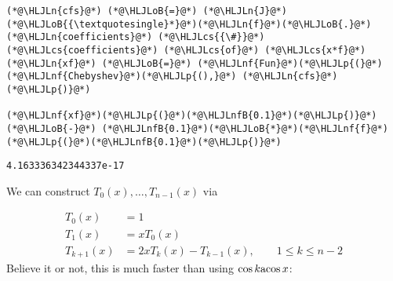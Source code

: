 \documentclass[12pt,a4paper]{article}
\newcommand{\HLJLn}[1]{#1}
\newcommand{\HLJLnf}[1]{\textcolor[RGB]{66,102,213}{#1}}
\newcommand{\HLJLnfB}[1]{\textcolor[RGB]{59,151,46}{#1}}
\newcommand{\HLJLoB}[1]{\textcolor[RGB]{102,102,102}{\textbf{#1}}}
\newcommand{\HLJLp}[1]{#1}
\newcommand{\HLJLcs}[1]{\textcolor[RGB]{153,153,119}{\textit{#1}}}
\def\acos{ {\rm acos}\, }
\begin{document}
\begin{lstlisting}
(*@\HLJLn{cfs}@*) (*@\HLJLoB{=}@*) (*@\HLJLn{J}@*)(*@\HLJLoB{{\textquotesingle}*}@*)(*@\HLJLn{f}@*)(*@\HLJLoB{.}@*)(*@\HLJLn{coefficients}@*) (*@\HLJLcs{{\#}}@*) (*@\HLJLcs{coefficients}@*) (*@\HLJLcs{of}@*) (*@\HLJLcs{x*f}@*)
(*@\HLJLn{xf}@*) (*@\HLJLoB{=}@*) (*@\HLJLnf{Fun}@*)(*@\HLJLp{(}@*)(*@\HLJLnf{Chebyshev}@*)(*@\HLJLp{(),}@*) (*@\HLJLn{cfs}@*)(*@\HLJLp{)}@*)

(*@\HLJLnf{xf}@*)(*@\HLJLp{(}@*)(*@\HLJLnfB{0.1}@*)(*@\HLJLp{)}@*) (*@\HLJLoB{-}@*) (*@\HLJLnfB{0.1}@*)(*@\HLJLoB{*}@*)(*@\HLJLnf{f}@*)(*@\HLJLp{(}@*)(*@\HLJLnfB{0.1}@*)(*@\HLJLp{)}@*)
\end{lstlisting}

\begin{lstlisting}
4.163336342344337e-17
\end{lstlisting}


We can construct $T_0(x),\ldots,T_{n-1}(x)$ via


\begin{align*}
    T_0(x) &= 1\\
    T_1(x) &= x T_0(x) \\
    T_{k+1}(x) &= 2x  T_k(x) -  T_{k-1}(x), \qquad 1 \leq k \leq n-2
\end{align*}
Believe it or not, this is much faster than using $\cos k \acos x$:
\end{document}
